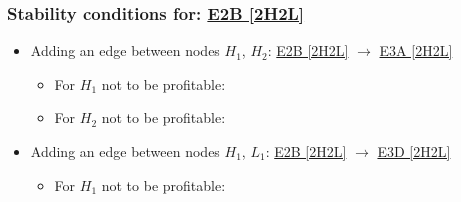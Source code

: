 

\subsubsection{Stability conditions for: \hyperref[apx:E2B:2H2L]{E2B [2H2L]}}
\label{apx:E2B:2H2L_stability_cond}

\begin{itemize}

	\item Adding an edge between nodes $H_1$, $H_2$: \hyperref[apx:E2B:2H2L]{E2B [2H2L]} $\to$ \hyperref[apx:E3A:2H2L]{E3A [2H2L]}

	\begin{itemize}

		\item For $H_1$ not to be profitable:


		\item For $H_2$ not to be profitable:


	\end{itemize}

	\item Adding an edge between nodes $H_1$, $L_1$: \hyperref[apx:E2B:2H2L]{E2B [2H2L]} $\to$ \hyperref[apx:E3D:2H2L]{E3D [2H2L]}

	\begin{itemize}

		\item For $H_1$ not to be profitable:


\end{itemize}
\end{itemize}
